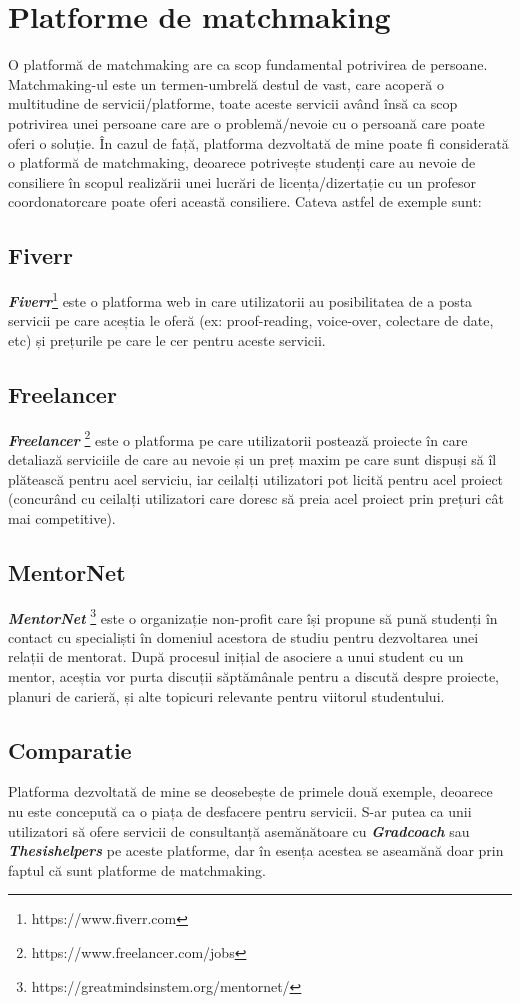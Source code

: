 \documentclass[12pt,a4paper,hidelinks]{report}
\theoremstyle{definition}
\theoremstyle{remark}
\begin{document}
\section{Platforme de matchmaking}
O platformă de matchmaking are ca scop fundamental potrivirea de persoane. Matchmaking-ul este un termen-umbrelă destul de vast, care acoperă o multitudine de servicii/platforme, toate aceste servicii având însă ca scop potrivirea unei persoane care are o problemă/nevoie cu o persoană care poate oferi o soluție. În cazul de față, platforma dezvoltată de mine poate fi considerată o platformă de matchmaking, deoarece potrivește studenți care au nevoie de consiliere în scopul realizării unei lucrări de licența/dizertație cu un profesor coordonatorcare poate oferi această consiliere.
Cateva astfel de exemple sunt:
\subsection{Fiverr}
\textbf{\textit{Fiverr}}\footnote[1]{https://www.fiverr.com} este o platforma web in care utilizatorii au posibilitatea de a posta servicii pe care aceștia le oferă (ex: proof-reading, voice-over, colectare de date, etc) și prețurile pe care le cer pentru aceste servicii.
\subsection{Freelancer}
\textbf{\textit{Freelancer}} \footnote[2]{https://www.freelancer.com/jobs} este o platforma pe care utilizatorii postează proiecte în care detaliază serviciile de care au nevoie și un preț maxim pe care sunt dispuși să îl plătească pentru acel serviciu, iar ceilalți utilizatori pot licită pentru acel proiect (concurând cu ceilalți utilizatori care doresc să preia acel proiect prin prețuri cât mai competitive).
\subsection{MentorNet}
\textbf{\textit{MentorNet}} \footnote[3]{https://greatmindsinstem.org/mentornet/} este o organizație non-profit care își propune să pună studenți în contact cu specialiști în domeniul acestora de studiu pentru dezvoltarea unei relații de mentorat. După procesul inițial de asociere a unui student cu un mentor, aceștia vor purta discuții săptămânale  pentru a discută despre proiecte, planuri de carieră, și alte topicuri relevante pentru viitorul studentului.
\subsection{Comparatie}
Platforma dezvoltată de mine se deosebește de primele două exemple, deoarece nu este concepută ca o piața de desfacere pentru servicii. S-ar putea ca unii utilizatori să ofere servicii de consultanță asemănătoare cu \textbf{\textit{Gradcoach}} sau \textbf{\textit{Thesishelpers}} pe aceste platforme, dar în esența acestea se aseamănă doar prin faptul că sunt platforme de matchmaking.
\end{document}
